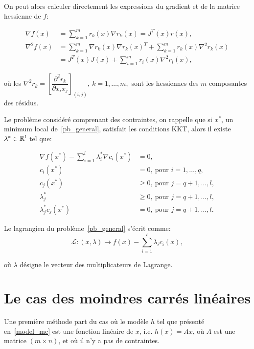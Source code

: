 On peut alors calculer directement les expressions du gradient et de la matrice hessienne de $f$:

\begin{align}
  \nabla f(x) &= \sum_{k=1}^mr_k(x)\nabla r_k(x) = J^T(x)r(x)\label{grad_f},\\
  \nabla^2f(x) &=  \sum_{k=1}^m\nabla r_k(x)\nabla r_k(x)^T +  \sum_{k=1}^mr_k(x)\nabla^2 r_k(x) \\
  &= J^T(x)J(x) + \sum_{i=1}^m r_i(x)\nabla^2r_i(x)\label{hess_f},
\end{align}

où les $\nabla^2 r_k=\left[\dfrac{\partial^2r_k}{\partial x_ix_j}\right]_{(i,j)},\ k=1,\ldots,m,$ sont les hessiennes des $m$ composantes des résidus.

Le problème considéré comprenant des contraintes, on rappelle que si $x^{*}$, un minimum local de~\eqref{pb_general}, 
satisfait les conditions KKT, alors il existe $\lambda^{*} \in \mathbb{R}^{l}$ tel que:

\begin{equation}\label{kkt}
\begin{aligned}
\nabla f(x^{*}) - \sum\limits_{i=1}^{l} \lambda_{i}^{*}\nabla c_{i}(x^{*})&= 0,\\
c_{i}(x^{*}) &= 0, \ \text{pour } i=1,\ldots,q,\\
c_{j}(x^{*}) &\geq 0, \ \text{pour } j=q+1,\ldots,l,\\
\lambda_{j}^{*} &\geq 0, \ \text{pour } j=q+1,\ldots,l,\\
\lambda_{j}^{*} c_{j}(x^{*}) &= 0, \ \text{pour } j=q+1,\ldots,l.
\end{aligned}
\end{equation}

Le lagrangien du problème~\eqref{pb_general} s'écrit comme:
\begin{equation}\label{lagrangien}
\mathcal{L}:(x,\lambda) \longmapsto f(x) - \sum\limits_{i=1}^l \lambda_{i}c_{i}(x),
\end{equation}

où $\lambda$ désigne le vecteur des multiplicateurs de Lagrange.


\section{Le cas des moindres carrés linéaires}\label{cas_lineaire}

Une première méthode part du cas où le modèle $h$ tel que présenté en~\eqref{model_mc} est une fonction linéaire de $x$, i.e. $h(x) = Ax$, où $A$ 
est une matrice $(m\times n)$, et où il n'y a pas de contraintes. 

